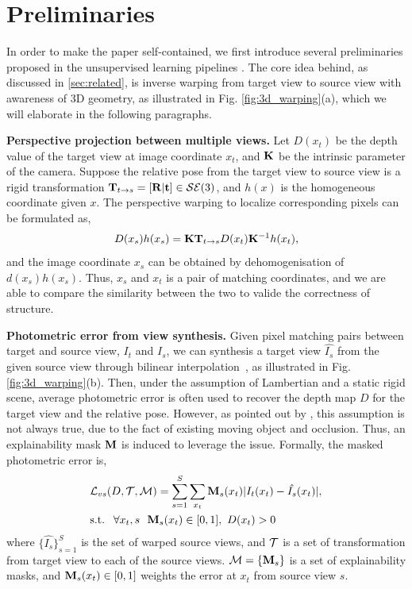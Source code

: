 \vspace{-0.7\baselineskip}
\section{Preliminaries}
\label{sec:preliminaries}
\vspace{-0.3\baselineskip}

In order to make the paper self-contained, we first introduce several preliminaries proposed in the unsupervised learning pipelines \cite{zhou2017unsupervised,godard2016unsupervised}. The core idea behind, as discussed in \ref{sec:related}, is inverse warping from target view to source view with awareness of 3D geometry, as illustrated in Fig. \ref{fig:3d_warping}(a), which we will elaborate in the following paragraphs.


\textbf{Perspective projection between multiple views.}
Let $D(x_t)$ be the depth value of the target view at image coordinate $x_t$, and ${\mathbf K}$ be the intrinsic parameter of the camera. Suppose the relative pose from the target view to source view is a rigid transformation ${\mathbf T}_{t\rightarrow s} = [{\mathbf R} | {\mathbf t}] \in {\mathcal S}{\mathcal E}(3)$, and $h(x)$ is the homogeneous coordinate given $x$. The perspective warping to localize corresponding pixels can be formulated as, 
\begin{align}
\label{eqn:warp}
D(x_s)h(x_s) = {\mathbf K}{\mathbf T}_{t\rightarrow s}D(x_t){\mathbf K}^{-1}h(x_t),
\end{align}
and the image coordinate $x_s$ can be obtained by dehomogenisation of $d(x_s)h(x_s)$. Thus, $x_s$ and $x_t$ is a pair of matching coordinates, and we are able to compare the similarity between the two to valide the correctness of structure.


\textbf{Photometric error from view synthesis.} 
\label{chap:warping}
Given pixel matching pairs between target and source view, \ie $I_t$ and $I_s$, we can synthesis a target view $\hat{I_s}$ from the given source view through bilinear interpolation~\cite{GargBR16}, as illustrated in Fig. \ref{fig:3d_warping}(b). 
Then, under the assumption of Lambertian and a static rigid scene, average photometric error is often used to recover the depth map $D$ for the target view and the relative pose. 
However, as pointed out by \cite{zhou2017unsupervised}, this assumption is not always true, due to the fact of existing moving object and occlusion. Thus, an explainability mask ${\mathbf M}$ is induced to leverage the issue. Formally, the masked photometric error is,
\begin{align}
\label{eqn:photometric}
& {\mathcal L}_{vs}(D, {\mathcal T}, {\mathcal M}) = \sum_{s=1}^{S}\sum_{x_t}{\mathbf M}_s(x_t)|I_t(x_t) - \hat{I_s}(x_t)|, \nonumber \\
& \text{s.t. ~} \forall x_t, s\text{~~} {\mathbf M}_s(x_t)\in [0, 1],\text{~} D(x_t) > 0
\end{align}
where $\{\hat{I_s}\}_{s=1}^{S}$ is the set of warped source views, and ${\mathcal T}$ is a set of transformation from target view to each of the source views. 
${\mathcal M} = \{{\mathbf M}_s\}$ is a set of explainability masks, and ${\mathbf M}_s(x_t) \in [0, 1]$ weights the error at $x_t$ from source view $s$.

